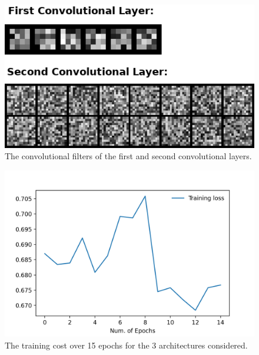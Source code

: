 \documentclass[manuscript,screen,review]{acmart}
\begin{document}
\begin{figure}[h]
  \centering
  \includegraphics[width=\linewidth]{../presentation/filters.png}
  \caption{The convolutional filters of the first and second convolutional layers.}
  \label{fig:filters}
\end{figure}





\begin{figure}[h]
  \centering
  \includegraphics[width=\linewidth]{../presentation/training_cost.png}
  \caption{The training cost over 15 epochs for the 3 architectures considered.}
  \label{fig:train}
\end{figure}
\end{document}
